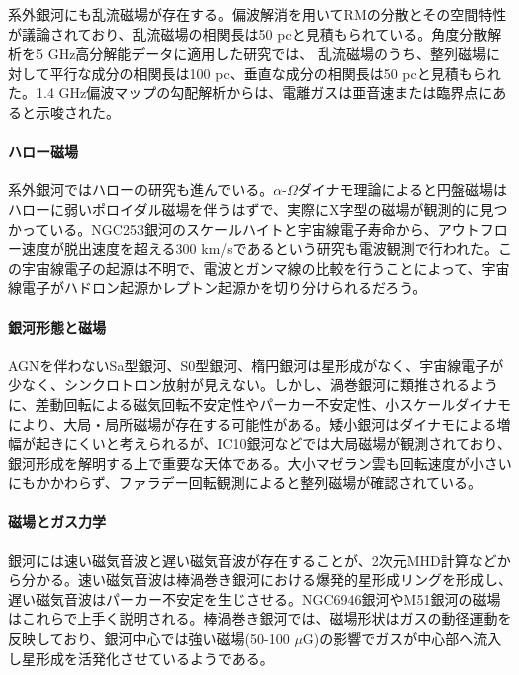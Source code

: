 系外銀河にも乱流磁場が存在する。偏波解消を用いてRMの分散とその空間特性が議論されており、乱流磁場の相関長は50 pcと見積もられている\citep{2007A&A...470..539B}。角度分散解析を5 GHz高分解能データに適用した研究では、 乱流磁場のうち、整列磁場に対して平行な成分の相関長は100 pc、垂直な成分の相関長は50 pcと見積もられた\citep{2013ApJ...766...49H}。1.4 GHz偏波マップの勾配解析からは、電離ガスは亜音速または臨界点にあると示唆された\citep{2012ApJ...749..145B}。

\paragraph{ハロー磁場}

系外銀河ではハローの研究も進んでいる。$\alpha$-$\Omega$ダイナモ理論によると円盤磁場はハローに弱いポロイダル磁場を伴うはずで、実際にX字型の磁場が観測的に見つかっている\citep{2014arXiv1401.1317K,2011A&A...531A.127S}。NGC253銀河のスケールハイトと宇宙線電子寿命から、アウトフロー速度が脱出速度を超える300 km/sであるという研究も電波観測で行われた\citep{2009A&A...506.1123H}。この宇宙線電子の起源は不明で、電波とガンマ線の比較を行うことによって、宇宙線電子がハドロン起源かレプトン起源かを切り分けられるだろう。

\paragraph{銀河形態と磁場}

AGNを伴わないSa型銀河、S0型銀河、楕円銀河は星形成がなく、宇宙線電子が少なく、シンクロトロン放射が見えない。しかし、渦巻銀河に類推されるように、差動回転による磁気回転不安定性やパーカー不安定性、小スケールダイナモにより、大局・局所磁場が存在する可能性がある。矮小銀河はダイナモによる増幅が起きにくいと考えられるが、IC10銀河などでは大局磁場が観測されており、銀河形成を解明する上で重要な天体である。大小マゼラン雲も回転速度が小さいにもかかわらず、ファラデー回転観測によると整列磁場が確認されている。

\paragraph{磁場とガス力学}

銀河には速い磁気音波と遅い磁気音波が存在することが、2次元MHD計算などから分かる。速い磁気音波は棒渦巻き銀河における爆発的星形成リングを形成し、遅い磁気音波はパーカー不安定を生じさせる。NGC6946銀河やM51銀河の磁場はこれらで上手く説明される。棒渦巻き銀河では、磁場形状はガスの動径運動を反映しており、銀河中心では強い磁場(50-100 $\mu$G)の影響でガスが中心部へ流入し星形成を活発化させているようである\citep{2005A&A...444..739B}。


